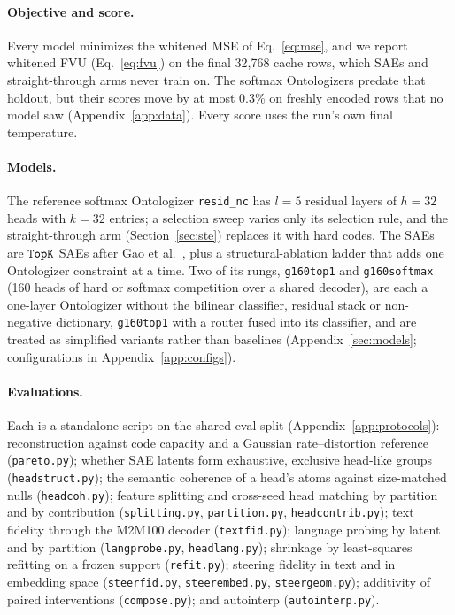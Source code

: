 \documentclass[11pt]{article}
\begin{document}
\paragraph{Objective and score.}
Every model minimizes the whitened MSE of Eq.~\eqref{eq:mse}, and we
report whitened FVU (Eq.~\eqref{eq:fvu}) on the final 32{,}768 cache
rows, which SAEs and straight-through arms never train on. The softmax
Ontologizers predate that holdout, but their scores move by at most
0.3\% on freshly encoded rows that no model saw
(Appendix~\ref{app:data}). Every score uses the run's own final
temperature.

\paragraph{Models.}
The reference softmax Ontologizer \texttt{resid\_nc} has $l{=}5$ residual
layers of $h{=}32$ heads with $k{=}32$ entries; a selection sweep varies
only its selection rule, and the straight-through arm
(Section~\ref{sec:ste}) replaces it with hard codes. The SAEs are $\mathop{\mathtt{TopK}}\limits$
SAEs after Gao et al.~\cite{gao2024}, plus a structural-ablation ladder
that adds one Ontologizer constraint at a time. Two of its rungs,
\texttt{g160top1} and \texttt{g160softmax} (160 heads of hard or softmax
competition over a shared decoder), are each a one-layer Ontologizer
without the bilinear classifier, residual stack or non-negative
dictionary, \texttt{g160top1} with a router fused into its classifier,
and are treated as simplified variants rather than baselines
(Appendix~\ref{sec:models}; configurations in Appendix~\ref{app:configs}).

\paragraph{Evaluations.}
Each is a standalone script on the shared eval split
(Appendix~\ref{app:protocols}): reconstruction against code capacity and
a Gaussian rate--distortion reference (\texttt{pareto.py}); whether SAE latents form
exhaustive, exclusive head-like groups (\texttt{headstruct.py}); the
semantic coherence of a head's atoms against size-matched nulls
(\texttt{headcoh.py}); feature splitting and cross-seed head matching by
partition and by contribution (\texttt{splitting.py}, \texttt{partition.py},
\texttt{headcontrib.py}); text fidelity through the M2M100 decoder
(\texttt{textfid.py}); language probing by latent and by partition
(\texttt{langprobe.py}, \texttt{headlang.py}); shrinkage by least-squares
refitting on a frozen support (\texttt{refit.py}); steering fidelity in
text and in embedding space (\texttt{steerfid.py}, \texttt{steerembed.py},
\texttt{steergeom.py}); additivity of paired interventions
(\texttt{compose.py}); and autointerp (\texttt{autointerp.py}).
\end{document}
